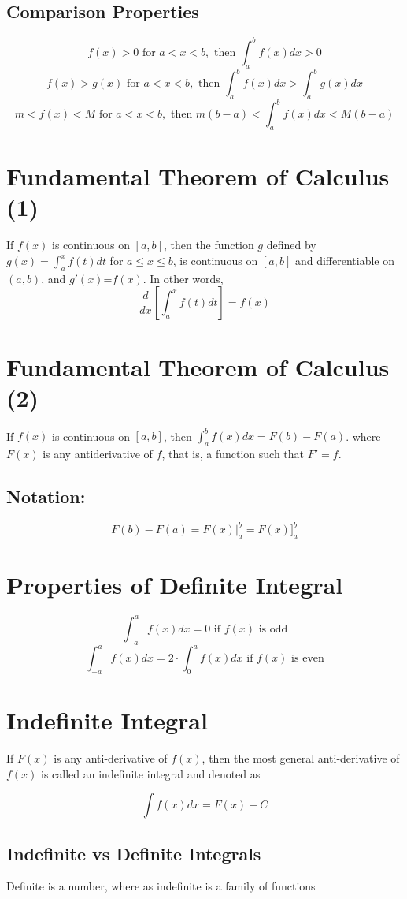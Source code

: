 \documentclass[12pt]{article}
\begin{document}
\subsection{Comparison Properties}

$$f(x)>0 \text{ for } a < x < b, \text{ then } \int_a^b f(x)dx > 0$$ 
$$f(x)>g(x) \text{ for } a < x < b, \text{ then } \int_a^b f(x)dx > \int_a^b g(x)dx$$ 
$$m<f(x)<M \text{ for } a < x < b, \text{ then } m(b-a) < \int_a^b f(x)dx < M(b-a)$$ 


\section{Fundamental Theorem of Calculus (1)} 
If $f(x)$ is continuous on $[a,b]$, then the function $g$ defined by  $g(x) = \int_a^x f(t) dt$ for $a \leq x \leq b$, is continuous on $[a,b]$ and differentiable on $(a,b)$, and $g'(x)$=$f(x)$. In other words, 
$$\frac{d}{dx} \left[\int_a^x f(t)dt \right] = f(x)$$

\section{Fundamental Theorem of Calculus (2)} 
If $f(x)$ is continuous on $[a,b]$, then $\int_a^b f(x)dx = F(b)-F(a)$. where   $F(x)$ is any antiderivative of $f$, that is, a function such that $F'=f$.

\subsection{Notation:} 
$$F(b)-F(a) = F(x)\big|_a^b = F(x)\big]_a^b$$

\section{Properties of Definite Integral}
$$\int_{-a}^a f(x)dx = 0\text{ if } f(x) \text{ is odd}$$
$$\int_{-a}^a f(x)dx = 2\cdot\int_{0}^a f(x)dx \text{ if } f(x) \text{ is even}$$




\section{Indefinite Integral} If $F(x)$ is any anti-derivative of $f(x)$, then the most general anti-derivative of $f(x)$ is called an indefinite integral and denoted as 

$$\int f(x)dx = F(x) + C$$

\subsection{Indefinite vs Definite Integrals} Definite is a number, where as indefinite is a family of functions
\end{document}
